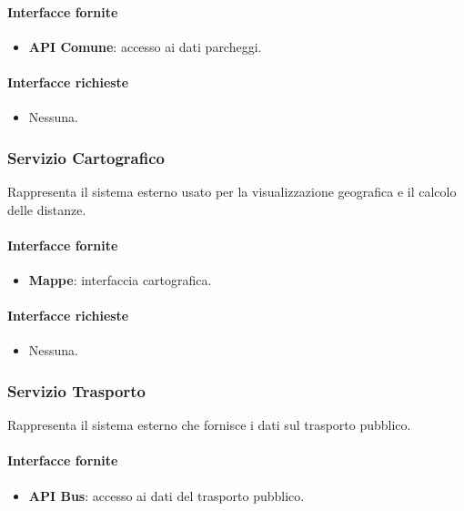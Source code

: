 \documentclass[12pt,a4paper]{article}
\begin{document}
\paragraph{Interfacce fornite}
\begin{itemize}
    \item \textbf{API Comune}: accesso ai dati parcheggi.
\end{itemize}

\paragraph{Interfacce richieste}
\begin{itemize}
    \item Nessuna.
\end{itemize}

\subsubsection{Servizio Cartografico}
Rappresenta il sistema esterno usato per la visualizzazione geografica e il calcolo delle distanze.

\paragraph{Interfacce fornite}
\begin{itemize}
    \item \textbf{Mappe}: interfaccia cartografica.
\end{itemize}

\paragraph{Interfacce richieste}
\begin{itemize}
    \item Nessuna.
\end{itemize}

\subsubsection{Servizio Trasporto}
Rappresenta il sistema esterno che fornisce i dati sul trasporto pubblico.

\paragraph{Interfacce fornite}
\begin{itemize}
    \item \textbf{API Bus}: accesso ai dati del trasporto pubblico.
\end{itemize}
\end{document}
